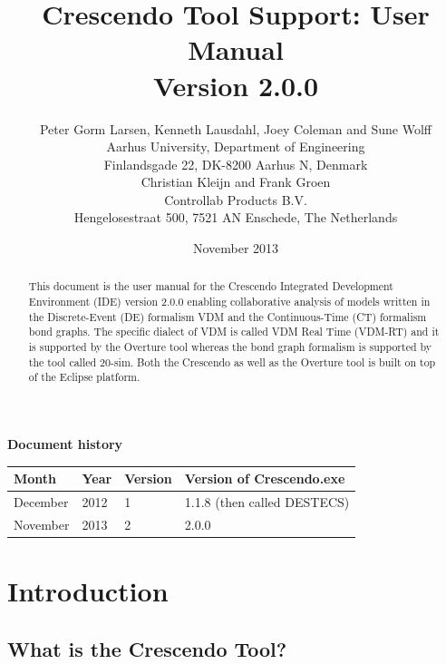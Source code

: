 \documentclass{crescendorepchap}
\begin{document}
\frontmatter

\title{Crescendo Tool Support: User Manual \\{\large Version 2.0.0}}
\author{Peter Gorm Larsen, Kenneth Lausdahl, Joey Coleman and Sune Wolff \\
Aarhus University, Department of Engineering\\
Finlandsgade 22, DK-8200 Aarhus N, Denmark\\[5mm]
Christian Kleijn and Frank Groen\\
Controllab Products B.V.\\
Hengelosestraat 500, 7521 AN Enschede, The Netherlands
}

\date{November 2013}


\maketitle


\textbf{Document history}

\begin{tabular}{|l|l|l|l|}\hline
Month   & Year & Version & Version of Crescendo.exe \\ \hline
December& 2012 & 1       & 1.1.8 (then called DESTECS)  \\ \hline
November& 2013 & 2       & 2.0.0 \\ \hline
\end{tabular}

\tableofcontents

\begin{abstract}
This document is the user manual for the Crescendo Integrated
Development Environment (IDE) version 2.0.0 enabling collaborative
analysis of models written in the Discrete-Event (DE) formalism VDM
and the Continuous-Time (CT) formalism bond graphs. The specific
dialect of VDM is called VDM Real Time (VDM-RT) and it is supported by
the Overture tool whereas the bond graph formalism is supported by the
tool called 20-sim.  Both the Crescendo as well as the Overture tool
is built on top of the Eclipse platform.
\end{abstract}

\mainmatter

\chapter{Introduction}

\section{What is the Crescendo Tool?}\label{sec:crescendointro}
\end{document}
